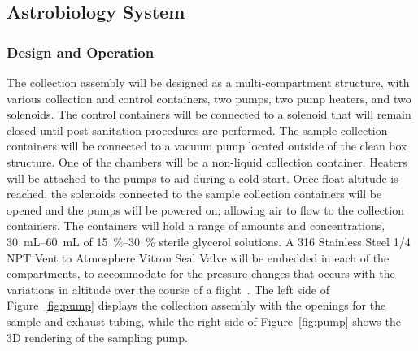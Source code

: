 \subsection{Astrobiology System}
\label{sec:Astrobiology System}

\subsubsection{Design and Operation}
The collection assembly will be designed as a multi-compartment structure, with various collection and control containers, two pumps, two pump heaters, and two solenoids.  The control containers will be connected to a solenoid that will remain closed until post-sanitation procedures are performed. The sample collection containers will be connected to a vacuum pump located outside of the clean box structure.  One of the chambers will be a non-liquid collection container. Heaters will be attached to the pumps to aid during a cold start. Once float altitude is reached, the solenoids connected to the sample collection containers will be opened and the pumps will be powered on; allowing air to flow to the collection containers. The containers will hold a range of amounts and concentrations, \SIrange{30}{60}{\milli\liter} of \SIrange{15}{30}{\%} sterile glycerol solutions. A 316 Stainless Steel \SI{1/4}{\inch} NPT Vent to Atmosphere Vitron Seal Valve will be embedded in each of the compartments, to accommodate for the pressure changes that occurs with the variations in altitude over the course of a flight~\cite{valve}.  The left side of Figure~\ref{fig:pump} displays the collection assembly with the openings for the sample and exhaust tubing, while the right side of Figure~\ref{fig:pump} shows the 3D rendering of the sampling pump.  

